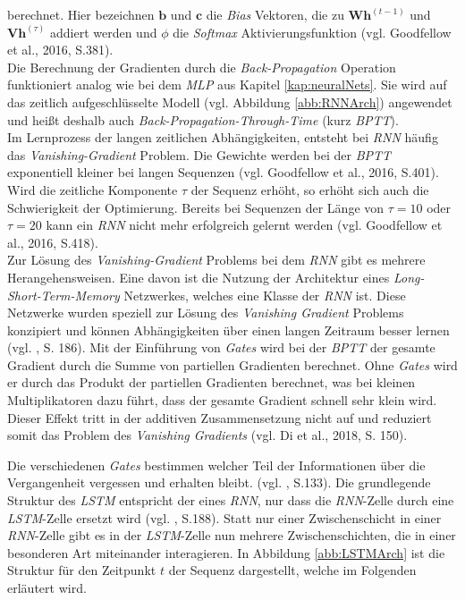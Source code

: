 \documentclass[a4paper,11pt]{article}
\begin{document}
berechnet. Hier bezeichnen $\bm{b}$ und $\bm{c}$ die \textit{Bias} Vektoren, die zu $\bm{W} \bm{h}^{(t-1)} $ und $\bm{V}\bm{h}^{(\tau)} $ addiert werden und $\phi$ die \textit{Softmax} Aktivierungsfunktion (vgl. Goodfellow et al., 2016, S.381).\\ 
Die Berechnung der Gradienten durch die \textit{Back-Propagation} Operation funktioniert analog wie bei dem \textit{MLP} aus Kapitel \ref{kap:neuralNets}. Sie wird auf das zeitlich aufgeschlüsselte Modell (vgl. Abbildung \ref{abb:RNNArch}) angewendet und heißt deshalb auch \textit{Back-Propagation-Through-Time} (kurz \textit{BPTT}). \\
Im Lernprozess der langen zeitlichen Abhängigkeiten, entsteht bei \textit{RNN} häufig das \textit{Vanishing-Gradient} Problem.
Die Gewichte werden bei der \textit{BPTT} exponentiell kleiner bei langen Sequenzen (vgl. Goodfellow et al., 2016, S.401). Wird die zeitliche Komponente $\tau$ der Sequenz erhöht, so erhöht sich auch die Schwierigkeit der Optimierung.
Bereits bei Sequenzen der Länge von $\tau = 10$ oder $\tau = 20$ kann ein \textit{RNN} nicht mehr erfolgreich gelernt werden (vgl. Goodfellow et al., 2016, S.418).\\

Zur Lösung des \textit{Vanishing-Gradient} Problems bei dem \textit{RNN} gibt es mehrere Herangehensweisen. Eine davon ist die Nutzung der Architektur eines \textit{Long-Short-Term-Memory} Netzwerkes, welches eine Klasse der \textit{RNN} ist. Diese Netzwerke wurden speziell zur Lösung des \textit{Vanishing Gradient} Problems konzipiert und können Abhängigkeiten über einen langen Zeitraum besser lernen (vgl. \cite{keras}, S. 186). Mit der Einführung von \textit{Gates} wird bei der \textit{BPTT} der gesamte Gradient durch die Summe von partiellen Gradienten berechnet. Ohne \textit{Gates} wird er durch das Produkt der partiellen Gradienten berechnet, was bei kleinen Multiplikatoren dazu führt, dass der gesamte Gradient schnell sehr klein wird. Dieser Effekt tritt in der additiven Zusammensetzung nicht auf und reduziert somit das Problem des \textit{Vanishing Gradients} (vgl. Di et al., 2018, S. 150).

Die verschiedenen \textit{Gates} bestimmen welcher Teil der Informationen über die Vergangenheit vergessen und erhalten bleibt. (vgl. \cite{deepNLP}, S.133). Die grundlegende Struktur des \textit{LSTM} entspricht der eines \textit{RNN}, nur dass die \textit{RNN}-Zelle durch eine \textit{LSTM}-Zelle ersetzt wird (vgl. \cite{keras}, S.188). Statt nur einer Zwischenschicht in einer \textit{RNN}-Zelle gibt es in der \textit{LSTM}-Zelle nun mehrere Zwischenschichten, die in einer besonderen Art miteinander interagieren. In Abbildung \ref{abb:LSTMArch} ist die Struktur für den Zeitpunkt $t$ der Sequenz dargestellt, welche im Folgenden erläutert wird.
\end{document}
